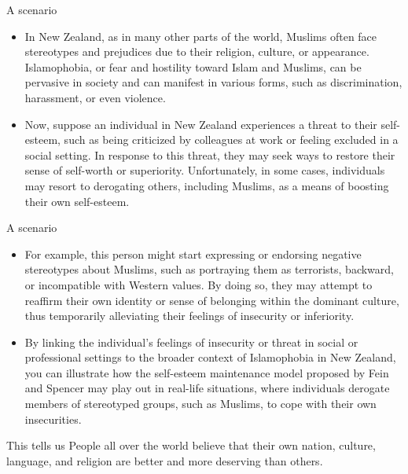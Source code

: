 \documentclass[
  ignorenonframetext,
  aspectratio=169,
]{beamer}
\providecommand{\tightlist}{%
  \setlength{\itemsep}{0pt}\setlength{\parskip}{0pt}}\usepackage{longtable,booktabs,array}
\begin{document}
\begin{frame}{A scenario}
\label{a-scenario}
\begin{itemize}[<+->]
\tightlist
\item
  In New Zealand, as in many other parts of the world, Muslims often
  face stereotypes and prejudices due to their religion, culture, or
  appearance. Islamophobia, or fear and hostility toward Islam and
  Muslims, can be pervasive in society and can manifest in various
  forms, such as discrimination, harassment, or even violence.
\item
  Now, suppose an individual in New Zealand experiences a threat to
  their self-esteem, such as being criticized by colleagues at work or
  feeling excluded in a social setting. In response to this threat, they
  may seek ways to restore their sense of self-worth or superiority.
  Unfortunately, in some cases, individuals may resort to derogating
  others, including Muslims, as a means of boosting their own
  self-esteem.
\end{itemize}
\end{frame}

\begin{frame}{A scenario}
\label{a-scenario-1}
\begin{itemize}[<+->]
\tightlist
\item
  For example, this person might start expressing or endorsing negative
  stereotypes about Muslims, such as portraying them as terrorists,
  backward, or incompatible with Western values. By doing so, they may
  attempt to reaffirm their own identity or sense of belonging within
  the dominant culture, thus temporarily alleviating their feelings of
  insecurity or inferiority.
\item
  By linking the individual's feelings of insecurity or threat in social
  or professional settings to the broader context of Islamophobia in New
  Zealand, you can illustrate how the self-esteem maintenance model
  proposed by Fein and Spencer may play out in real-life situations,
  where individuals derogate members of stereotyped groups, such as
  Muslims, to cope with their own insecurities.
\end{itemize}
\end{frame}

\begin{frame}{This tells us}
\label{this-tells-us}
People all over the world believe that their own nation, culture,
language, and religion are better and more deserving than others.
\end{frame}
\end{document}

